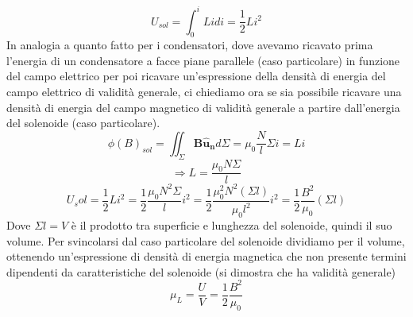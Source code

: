 \documentclass[10pt,a4paper]{article}
\begin{document}
\[U_{sol} = \int_{0}^{i}Lidi=\frac{1}{2}Li^2\]
In analogia a quanto fatto per i condensatori, dove avevamo ricavato prima l'energia di un condensatore a facce piane parallele (caso particolare) in funzione del campo elettrico per poi ricavare un'espressione della densità di energia del campo elettrico di validità generale, ci chiediamo ora se sia possibile ricavare una densità di energia del campo magnetico di validità generale a partire dall'energia del solenoide (caso particolare). 
\[\phi(B)_{sol} = \iint_{\Sigma}\mathbf{B}\mathbf{\hat{u}_n}d\Sigma = \mu_0 \frac{N}{l}\Sigma i = Li\]
\[\Rightarrow L = \frac{\mu_0 N\Sigma}{l}\]
\[U_sol = \frac{1}{2}Li^2 = \frac{1}{2}\frac{\mu_0 N^2\Sigma}{l}i^2=\frac{1}{2}\frac{\mu_0^2 N^2(\Sigma l)}{\mu_0 l^2}i^2=\frac{1}{2}\frac{B^2}{\mu_0}(\Sigma l)\]
Dove \(\Sigma l= V \) è il prodotto tra superficie e lunghezza del solenoide, quindi il suo volume. Per svincolarsi dal caso particolare del solenoide dividiamo per il volume, ottenendo un'espressione di densità di energia magnetica che non presente termini dipendenti da caratteristiche del solenoide (si dimostra che ha validità generale)
\[\mu_L = \frac{U}{V} =\frac{1}{2}\frac{B^2}{\mu_0} \]
\end{document}
